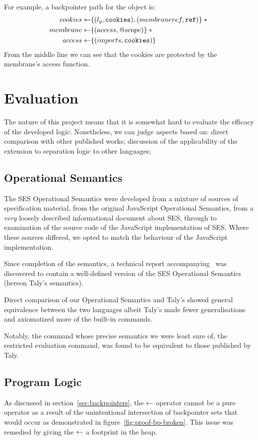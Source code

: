 \documentclass[a4paper,notitlepage]{report}
\begin{document}
For example, a backpointer path for the  object is:
\begin{align*}
  cookies \leftarrow & \{(l_g, \mathtt{cookies}), (membraneref, \mathtt{ref})\} \mathbin{*} {} \\
  membrane \leftarrow & \{(access, @scope)\} \mathbin{*} {} \\
  access \leftarrow & \{(imports, \mathtt{cookies})\}
\end{align*}
From the middle line we can see that the cookies are protected by the membrane's
access function.


\chapter{Evaluation}
The nature of this project means that it is somewhat hard to evaluate the
efficacy of the developed logic. Nonetheless, we can judge aspects based on:
direct comparison with other published works; discussion of the applicability of
the extension to separation logic to other languages; 

\section{Operational Semantics}
The SES Operational Semantics were developed from a mixture of sources of
specification material, from the original JavaScript Operational Semantics, from
a \emph{very} loosely described informational document about SES, through to
examination of the source code of the JavaScript implementation of SES.
Where these sources differed, we opted to match the behaviour of the JavaScript
implementation.

Since completion of the semantics, a technical report
accompanying~\cite{ses-semantics} was discovered to contain a well-defined
version of the SES Operational Semantics (hereon Taly's semantics).

Direct comparison of our Operational Semantics and Taly's
showed general equivalence between the two languages albeit Taly's made fewer
generalisations and axiomatized more of the built-in commands.

Notably, the command whose precise semantics we were least sure of, the
restricted evaluation command, was found to be equivalent to those published by
Taly.

\section{Program Logic}
As discussed in section~\ref{sec:backpointers}, the $\leftarrow$ operator cannot be a
pure operator as a result of the unintentional intersection of backpointer sets
that would occur as demonstrated in figure~\ref{fig:proof-bp-broken}. This issue
was remedied by giving the $\leftarrow$ a footprint in the heap.
\end{document}
